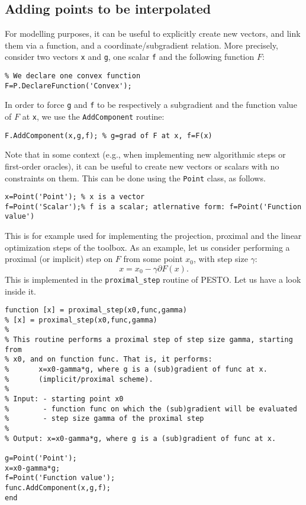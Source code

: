 \documentclass[11pt,a4paper]{article}
\begin{document}
\subsection{Adding points to be interpolated}
For modelling purposes, it can be useful to explicitly create new vectors, and link them via a function, and a coordinate/subgradient relation. More precisely, consider two vectors \verb?x? and \verb?g?, one scalar \verb?f? and the following function $F$:\\[-1cm]
\begin{lstlisting}
% We declare one convex function
F=P.DeclareFunction('Convex');
\end{lstlisting}
In order to force \verb?g? and \verb?f? to be respectively a subgradient and the function value of $F$ at \verb?x?, we use the \verb?AddComponent? routine:\\[-1cm]
\begin{lstlisting}
F.AddComponent(x,g,f); % g=grad of F at x, f=F(x)
\end{lstlisting}
Note that in some context (e.g., when implementing new algorithmic steps or first-order oracles), it can be useful to create new vectors or scalars with no constraints on them. This can be done using the \verb?Point? class, as follows.\\[-1cm]
\begin{lstlisting}
x=Point('Point'); % x is a vector
f=Point('Scalar');% f is a scalar; atlernative form: f=Point('Function value')
\end{lstlisting}
This is for example used for implementing the projection, proximal and the linear optimization steps of the toolbox. As an example, let us consider performing a proximal (or implicit) step on $F$ from some point $x_0$, with step size $\gamma$:
\[x=x_0-\gamma \partial F(x).\]
This is implemented in the \verb?proximal_step? routine of PESTO. Let us have a look inside it.\\[-1cm]
\begin{lstlisting}
function [x] = proximal_step(x0,func,gamma)
% [x] = proximal_step(x0,func,gamma)
%
% This routine performs a proximal step of step size gamma, starting from
% x0, and on function func. That is, it performs:
%       x=x0-gamma*g, where g is a (sub)gradient of func at x.
%       (implicit/proximal scheme).
%
% Input: - starting point x0
%        - function func on which the (sub)gradient will be evaluated
%        - step size gamma of the proximal step
%
% Output: x=x0-gamma*g, where g is a (sub)gradient of func at x.

g=Point('Point');
x=x0-gamma*g;
f=Point('Function value');
func.AddComponent(x,g,f);
end
\end{lstlisting}
\end{document}
